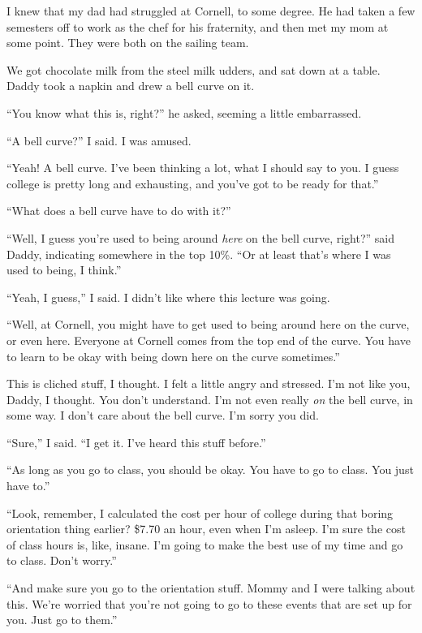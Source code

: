 I knew that my dad had struggled at Cornell, to some degree.  He had taken a few
semesters off to work as the chef for his fraternity, and then met my mom at
some point.  They were both on the sailing team.

We got chocolate milk from the steel milk udders, and sat down at a table.
Daddy took a napkin and drew a bell curve on it.

``You know what this is, right?'' he asked, seeming a little embarrassed.

``A bell curve?'' I said.  I was amused.

``Yeah!  A bell curve.  I've been thinking a lot, what I should say to you.  I
guess college is pretty long and exhausting, and you've got to be ready for that.''  

``What does a bell curve have to do with it?''

``Well, I guess you're used to being around \textit{here} on the bell curve,
right?'' said Daddy, indicating somewhere in the top 10\%.  ``Or at least that's
where I was used to being, I think.''  

``Yeah, I guess,'' I said.  I didn't like where this lecture was going.

``Well, at Cornell, you might have to get used to being around here on the
curve, or even here.  Everyone at Cornell comes from the top end of the curve.
You have to learn to be okay with being down here on the curve sometimes.''

This is cliched stuff, I thought.  I felt a little angry and stressed.  I'm not
like you, Daddy, I thought.  You don't understand.  I'm not even really
\textit{on} the bell curve, in some way.  I don't care about the bell curve.
I'm sorry you did.

``Sure,'' I said.  ``I get it.  I've heard this stuff before.''

``As long as you go to class, you should be okay.  You have to go to class.  You
just have to.''

``Look, remember, I calculated the cost per hour of college during that boring
orientation thing earlier?  \$7.70 an hour, even when I'm asleep.  I'm sure the
cost of class hours is, like, insane.  I'm going to make the best use of my time
and go to class. Don't worry.''

``And make sure you go to the orientation stuff.  Mommy and I were talking about
this.  We're worried that you're not going to go to these events that are set up
for you.  Just go to them.''

